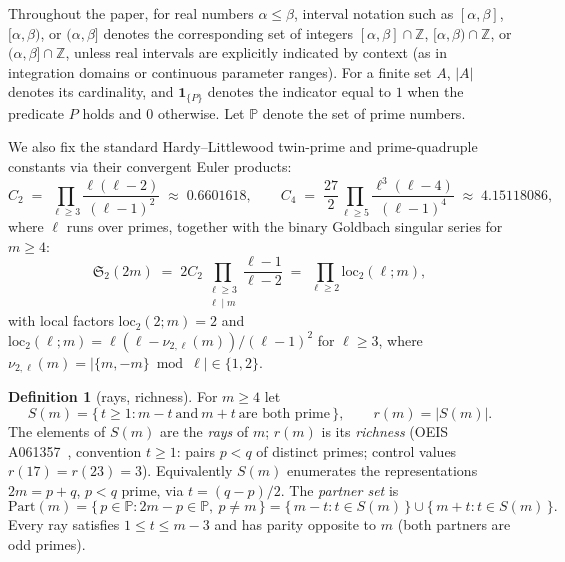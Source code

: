 \documentclass[11pt]{article}
\theoremstyle{plain}
\theoremstyle{definition}
\newtheorem{definition}[theorem]{Definition}
\newcommand{\rays}{S}
\newcommand{\rch}{r}
\begin{document}
Throughout the paper, for real numbers $\alpha \le \beta$, interval
notation such as $[\alpha,\beta]$, $[\alpha,\beta)$, or
$(\alpha,\beta]$ denotes the corresponding set of integers
$[\alpha,\beta] \cap \mathbb{Z}$, $[\alpha,\beta) \cap \mathbb{Z}$,
or $(\alpha,\beta] \cap \mathbb{Z}$, unless real intervals are
explicitly indicated by context (as in integration domains or
continuous parameter ranges). For a finite set $A$, $|A|$ denotes
its cardinality, and $\mathbf{1}_{\{P\}}$ denotes the indicator
equal to $1$ when the predicate $P$ holds and $0$ otherwise. Let
$\mathbb{P}$ denote the set of prime numbers.

We also fix the standard Hardy--Littlewood twin-prime and
prime-quadruple constants via their convergent Euler products:
\[
C_2 \;=\; \prod_{\ell \ge 3} \frac{\ell(\ell - 2)}{(\ell - 1)^{2}}
 \;\approx\; 0.6601618,
\qquad
C_4 \;=\; \frac{27}{2} \prod_{\ell \ge 5}
 \frac{\ell^{3}(\ell - 4)}{(\ell - 1)^{4}}
 \;\approx\; 4.15118086,
\]
where $\ell$ runs over primes, together with the binary Goldbach
singular series for $m \ge 4$:
\[
\mathfrak{S}_2(2m)
 \;=\; 2 C_2 \prod_{\substack{\ell \ge 3 \\ \ell \mid m}}
 \frac{\ell - 1}{\ell - 2}
 \;=\; \prod_{\ell \ge 2} \mathrm{loc}_2(\ell; m),
\]
with local factors $\mathrm{loc}_2(2;m) = 2$ and
$\mathrm{loc}_2(\ell;m) = \ell(\ell - \nu_{2,\ell}(m))/(\ell-1)^{2}$
for $\ell \ge 3$, where
$\nu_{2,\ell}(m) = |\{m, -m\} \bmod \ell| \in \{1,2\}$.

\begin{definition}[rays, richness]\label{def:rays}
For $m \ge 4$ let
\[
\rays(m) = \{\,t \ge 1 : m-t \ \text{and}\ m+t \ \text{are both prime}\,\},
\qquad \rch(m) = |\rays(m)|.
\]
The elements of $\rays(m)$ are the \emph{rays} of $m$; $\rch(m)$ is
its \emph{richness} (OEIS A061357~\cite{oeis}, convention $t \ge 1$:
pairs $p < q$ of distinct primes; control values
$\rch(17) = \rch(23) = 3$). Equivalently $\rays(m)$ enumerates the
representations $2m = p + q$, $p < q$ prime, via $t = (q-p)/2$. The
\emph{partner set} is
\[
\mathrm{Part}(m)
 = \{\,p \in \mathbb{P} : 2m-p \in \mathbb{P},\ p \neq m\,\}
 = \{\,m - t : t \in \rays(m)\,\} \cup \{\,m + t : t \in \rays(m)\,\}.
\]
Every ray satisfies $1 \le t \le m-3$ and has parity opposite to $m$
(both partners are odd primes).
\end{definition}
\end{document}
